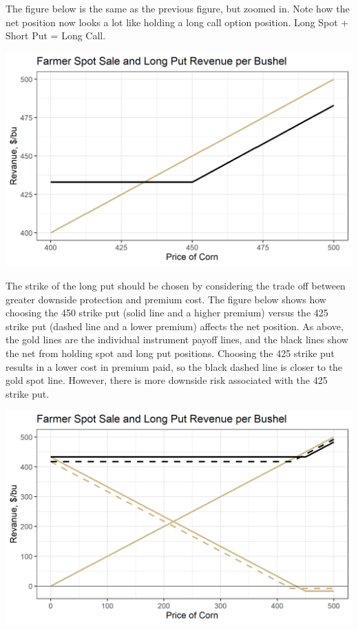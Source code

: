 \documentclass[
  letterpaper,
  DIV=11,
  numbers=noendperiod]{scrreprt}
\begin{document}
The figure below is the same as the previous figure, but zoomed in. Note
how the net position now looks a lot like holding a long call option
position. Long Spot + Short Put = Long Call.

\includegraphics{assets/Options4-spotputcombzoom.png}

The strike of the long put should be chosen by considering the trade off
between greater downside protection and premium cost. The figure below
shows how choosing the 450 strike put (solid line and a higher premium)
versus the 425 strike put (dashed line and a lower premium) affects the
net position. As above, the gold lines are the individual instrument
payoff lines, and the black lines show the net from holding spot and
long put positions. Choosing the 425 strike put results in a lower cost
in premium paid, so the black dashed line is closer to the gold spot
line. However, there is more downside risk associated with the 425
strike put.

\includegraphics{assets/Options4-spotputcombzoomchoice.png}
\end{document}
